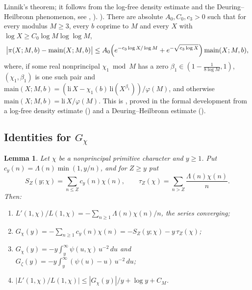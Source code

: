 \documentclass[11pt]{amsart}
\theoremstyle{plain}
\newtheorem{lemma}[theorem]{Lemma}
\theoremstyle{definition}
\numberwithin{equation}{section}
\begin{document}
\begin{enumerate}[label=\textup{(N\arabic*)}, leftmargin=3.2em]
  Linnik's theorem; it follows from the log-free density estimate and the Deuring--Heilbronn
  phenomenon, see \cite[Chapter~18]{iwaniec-kowalski}, \cite[Theorem~7]{gallagher}).
 ). There are absolute $A_0,C_0,c_3>0$ such that for every modulus $M\ge3$, every
  $b$ coprime to $M$ and every $X$ with $\log X\ge C_0\log M\log\log M$,
  \[
  \bigl|\pi(X;M,b)-\mathrm{main}(X;M,b)\bigr|\le
  A_0\Bigl(e^{-c_3\log X/\log M}+e^{-\sqrt{c_3\log X}}\Bigr)\,\mathrm{main}(X;M,b),
  \]
  where, if some real nonprincipal $\chi_1\bmod M$ has a zero $\beta_1\in(1-\frac1{8\log M},1)$,
  $(\chi_1,\beta_1)$ is one such pair and
  $\mathrm{main}(X;M,b)=(\mathrm{li}\,X-\chi_1(b)\,\mathrm{li}(X^{\beta_1}))/\varphi(M)$, and otherwise
  $\mathrm{main}(X;M,b)=\mathrm{li}\,X/\varphi(M)$. This is
  , proved in the formal development from a log-free density estimate
  () and a Deuring--Heilbronn estimate ().
\end{enumerate}

\subsection{Identities for $G_\chi$}

\begin{lemma}\label{lem:Gident}
Let $\chi$ be a nonprincipal primitive character and $y\ge1$. Put
$c_y(n)=\Lambda(n)\min(1,y/n)$, and for $Z\ge y$ put
\[
S_Z(y;\chi)=\sum_{n\le Z}c_y(n)\chi(n),\qquad \tau_Z(\chi)=\sum_{n>Z}\frac{\Lambda(n)\chi(n)}n.
\]
Then:
\begin{enumerate}[label=(\alph*)]
\item $L'(1,\chi)/L(1,\chi)=-\sum_{n\ge1}\Lambda(n)\chi(n)/n$, the series converging;
\item $G_\chi(y)=-\sum_{n\ge1}c_y(n)\chi(n)=-S_Z(y;\chi)-y\,\tau_Z(\chi)$;
\item $G_\chi(y)=-y\int_y^\infty\psi(u,\chi)\,u^{-2}\,du$ and $G_\zeta(y)=-y\int_y^\infty(\psi(u)-u)\,u^{-2}\,du$;
\item $|L'(1,\chi)/L(1,\chi)|\le |G_\chi(y)|/y+\log y+C_M$.
\end{enumerate}
\end{lemma}
\end{document}
